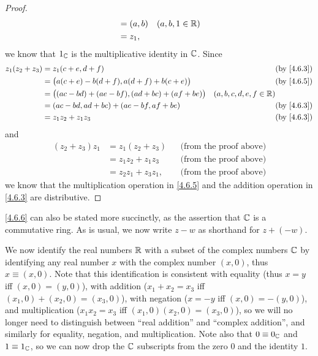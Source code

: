 \begin{proof}
\begin{align*}
               & = (a, b)                 & (a, b, 1 \in \mathbb{R})                                 \\
               & = z_1,
  \end{align*}
  we know that \(1_{\mathbb{C}}\) is the multiplicative identity in \(\mathbb{C}\).
  Since
  \begin{align*}
    z_1 (z_2 + z_3) & = z_1 (c + e, d + f)                                      &                           & \text{(by \cref{4.6.3})} \\
                    & = \big(a (c + e) - b (d + f), a (d + f) + b (c + e)\big)  &                           & \text{(by \cref{4.6.5})} \\
                    & = \big((ac - bd) + (ae - bf), (ad + bc) + (af + be) \big) & (a, b, c, d, e, f \in \R)                            \\
                    & = (ac - bd, ad + bc) + (ae - bf, af + be)                 &                           & \text{(by \cref{4.6.3})} \\
                    & = z_1 z_2 + z_1 z_3                                       &                           & \text{(by \cref{4.6.3})}
  \end{align*}
  and
  \begin{align*}
    (z_2 + z_3) z_1 & = z_1 (z_2 + z_3)    &  & \text{(from the proof above)} \\
                    & = z_1 z_2 + z_1 z_3  &  & \text{(from the proof above)} \\
                    & = z_2 z_1 + z_3 z_1, &  & \text{(from the proof above)}
  \end{align*}
  we know that the multiplication operation in \cref{4.6.5} and the addition operation in \cref{4.6.3} are distributive.
\end{proof}

\begin{note}
  \cref{4.6.6} can also be stated more succinctly, as the assertion that \(\mathbb{C}\) is a commutative ring.
  As is usual, we now write \(z - w\) as shorthand for \(z + (-w)\).
\end{note}

\begin{note}
  We now identify the real numbers \(\mathbb{R}\) with a subset of the complex numbers \(\mathbb{C}\) by identifying any real number \(x\) with the complex number \((x, 0)\), thus \(x \equiv (x, 0)\).
  Note that this identification is consistent with equality (thus \(x = y\) iff \((x, 0) = (y, 0)\)), with addition (\(x_1 + x_2 = x_3\) iff \((x_1, 0) + (x_2, 0) = (x_3, 0)\)), with negation (\(x = -y\) iff \((x, 0) = -(y, 0)\)), and multiplication (\(x_1 x_2 = x_3\) iff \((x_1, 0) (x_2, 0) = (x_3, 0)\)), so we will no longer need to distinguish between ``real addition'' and ``complex addition'', and similarly for equality, negation, and multiplication.
  Note also that \(0 \equiv 0_{\mathbb{C}}\) and \(1 \equiv 1_{\mathbb{C}}\), so we can now drop the \(\mathbb{C}\) subscripts from the zero \(0\) and the identity \(1\).
\end{note}

